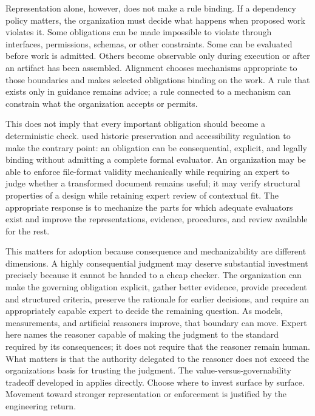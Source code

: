 Representation alone, however, does not make a rule binding. If a dependency policy matters, the organization must decide what happens when proposed work violates it. Some obligations can be made impossible to violate through interfaces, permissions, schemas, or other constraints. Some can be evaluated before work is admitted. Others become observable only during execution or after an artifact has been assembled. Alignment chooses mechanisms appropriate to those boundaries and makes selected obligations binding on the work. A rule that exists only in guidance remains advice; a rule connected to a mechanism can constrain what the organization accepts or permits.

This does not imply that every important obligation should become a deterministic check.  used historic preservation and accessibility regulation to make the contrary point: an obligation can be consequential, explicit, and legally binding without admitting a complete formal evaluator. An organization may be able to enforce file-format validity mechanically while requiring an expert to judge whether a transformed document remains useful; it may verify structural properties of a design while retaining expert review of contextual fit. The appropriate response is to mechanize the parts for which adequate evaluators exist and improve the representations, evidence, procedures, and review available for the rest.

This matters for adoption because consequence and mechanizability are different dimensions. A highly consequential judgment may deserve substantial investment precisely because it cannot be handed to a cheap checker. The organization can make the governing obligation explicit, gather better evidence, provide precedent and structured criteria, preserve the rationale for earlier decisions, and require an appropriately capable expert to decide the remaining question. As models, measurements, and artificial reasoners improve, that boundary can move. Expert here names the reasoner capable of making the judgment to the standard required by its consequences; it does not require that the reasoner remain human. What matters is that the authority delegated to the reasoner does not exceed the organization\textquotesingle s basis for trusting the judgment. The value-versus-governability tradeoff developed in  applies directly. Choose where to invest surface by surface. Movement toward stronger representation or enforcement is justified by the engineering return.

